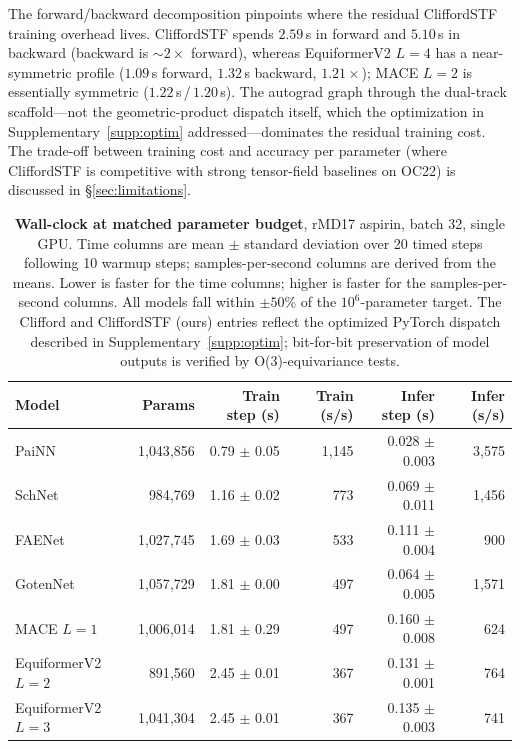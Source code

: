The forward/backward decomposition pinpoints where the residual CliffordSTF training overhead lives. CliffordSTF spends $2.59$\,s in forward and $5.10$\,s in backward (backward is $\sim\!2\times$ forward), whereas EquiformerV2 $L{=}4$ has a near-symmetric profile ($1.09$\,s forward, $1.32$\,s backward, $1.21\times$); MACE $L{=}2$ is essentially symmetric ($1.22$\,s\,/\,$1.20$\,s). The autograd graph through the dual-track scaffold---not the geometric-product dispatch itself, which the optimization in Supplementary~\ref{supp:optim} addressed---dominates the residual training cost. The trade-off between training cost and accuracy per parameter (where CliffordSTF is competitive with strong tensor-field baselines on OC22) is discussed in \S\ref{sec:limitations}.

\begin{table}[h]
\centering
\caption{\textbf{Wall-clock at matched parameter budget}, rMD17 aspirin, batch 32, single GPU. Time columns are mean $\pm$ standard deviation over 20 timed steps following 10 warmup steps; samples-per-second columns are derived from the means. Lower is faster for the time columns; higher is faster for the samples-per-second columns. All models fall within $\pm 50$\% of the $10^6$-parameter target. The Clifford and CliffordSTF (ours) entries reflect the optimized PyTorch dispatch described in Supplementary~\ref{supp:optim}; bit-for-bit preservation of model outputs is verified by O(3)-equivariance tests.}
\label{tab:wallclock}
\small
\begin{tabular}{lrrrrr}
\toprule
Model & Params & Train step (s) & Train (s/s) & Infer step (s) & Infer (s/s) \\
\midrule
PaiNN              & 1{,}043{,}856 & 0.79 $\pm$ 0.05 & 1{,}145 & 0.028 $\pm$ 0.003 & 3{,}575 \\
SchNet             &   984{,}769 & 1.16 $\pm$ 0.02 &   773 & 0.069 $\pm$ 0.011 & 1{,}456 \\
FAENet             & 1{,}027{,}745 & 1.69 $\pm$ 0.03 &   533 & 0.111 $\pm$ 0.004 &   900 \\
GotenNet           & 1{,}057{,}729 & 1.81 $\pm$ 0.00 &   497 & 0.064 $\pm$ 0.005 & 1{,}571 \\
MACE $L{=}1$       & 1{,}006{,}014 & 1.81 $\pm$ 0.29 &   497 & 0.160 $\pm$ 0.008 &   624 \\
EquiformerV2 $L{=}2$ &   891{,}560 & 2.45 $\pm$ 0.01 &   367 & 0.131 $\pm$ 0.001 &   764 \\
EquiformerV2 $L{=}3$ & 1{,}041{,}304 & 2.45 $\pm$ 0.01 &   367 & 0.135 $\pm$ 0.003 &   741 \\

\end{tabular}
\end{table}
